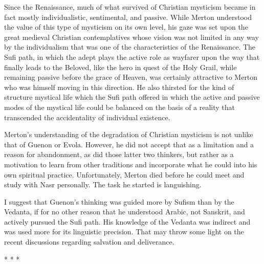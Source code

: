 \begin{quotex}
Since the Renaissance, much of what survived of Christian mysticism became in fact mostly individualistic, sentimental, and passive. While Merton understood the value of this type of mysticism on its own level, his gaze was set upon the great medieval Christian contemplatives whose vision was not limited in any way by the individualism that was one of the characteristics of the Renaissance. The Sufi path, in which the adept plays the active role as wayfarer upon the way that finally leads to the Beloved, like the hero in quest of the Holy Grail, while remaining passive before the grace of Heaven, was certainly attractive to Merton who was himself moving in this direction. He also thirsted for the kind of structure mystical life which the Sufi path offered in which the active and passive modes of the mystical life could be balanced on the basis of a reality that transcended the accidentality of individual existence. 

\end{quotex}
Merton's understanding of the degradation of Christian mysticism is not unlike that of Guenon or Evola. However, he did not accept that as a limitation and a reason for abandonment, as did those latter two thinkers, but rather as a motivation to learn from other traditions and incorporate what he could into his own spiritual practice. Unfortunately, Merton died before he could meet and study with Nasr personally. The task he started is languishing.

I suggest that Guenon's thinking was guided more by Sufism than by the Vedanta, if for no other reason that he understood Arabic, not Sanskrit, and actively pursued the Sufi path. His knowledge of the Vedanta was indirect and was used more for its linguistic precision. That may throw some light on the recent discussions regarding salvation and deliverance.




\begin{center}* * *\end{center}

